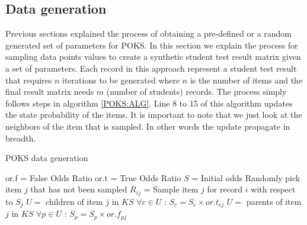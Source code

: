\subsection{Data generation}


Previous sections explained the process of obtaining a pre-defined or a random generated set of parameters for POKS. In this section we explain the process for sampling data points values to create a synthetic student test result matrix given a set of parameters. Each record in this approach represent a student test result that requires $n$ iterations to be generated where $n$ is the number of items and the final result matrix needs $m$ (number of students) records. The process simply follows steps in algorithm \ref{POKS:ALG}. Line 8 to 15 of this algorithm updates the state probability of the items. It is important to note that we just look at the neighbors of the item that is sampled. In other words the update propagate in breadth.


\begin{algorithm}
\caption{POKS data generation}
\label{CHalgorithm}
\begin{algorithmic}[1]
\State or.f = False Odds Ratio
\State or.t = True Odds Ratio
\State  $S$ = Initial odds
\State Randomly pick item $j$ that has not been sampled
\State $R_{ij}$ =  Sample item $j$ for record $i$ with respect to $S_j$
\State $U =$ children of item $j$ in $KS$
\State  $\forall c\in U$ :  $S_c = S_c\times or.t_{cj}$
\EndIf
{}
\State $U =$ parents of item $j$ in $KS$
\State  $\forall p\in U$ :  $S_p = S_p\times or.f_{pj}$
\EndIf
\EndFor
\EndFor
\end{algorithmic}
\label{POKS:ALG}
\end{algorithm}

